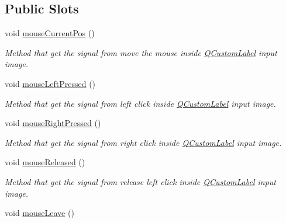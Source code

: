 \subsection*{Public Slots}
\begin{DoxyCompactItemize}
\item 
void \hyperlink{classMainWindow_a8501942bff62e974d8b4565257538c0f}{mouse\+Current\+Pos} ()
\begin{DoxyCompactList}\small\item\em Method that get the signal from move the mouse inside \hyperlink{classQCustomLabel}{Q\+Custom\+Label} input image. \end{DoxyCompactList}\item 
void \hyperlink{classMainWindow_a638cd98f8b593e868829541f2b9f6b63}{mouse\+Left\+Pressed} ()
\begin{DoxyCompactList}\small\item\em Method that get the signal from left click inside \hyperlink{classQCustomLabel}{Q\+Custom\+Label} input image. \end{DoxyCompactList}\item 
void \hyperlink{classMainWindow_ab78b5ef982f3e4d7613a03a9da6fb987}{mouse\+Right\+Pressed} ()
\begin{DoxyCompactList}\small\item\em Method that get the signal from right click inside \hyperlink{classQCustomLabel}{Q\+Custom\+Label} input image. \end{DoxyCompactList}\item 
void \hyperlink{classMainWindow_a089e5ff94a64d40dabe0a6eb36cc08f8}{mouse\+Released} ()\hypertarget{classMainWindow_a089e5ff94a64d40dabe0a6eb36cc08f8}{}\label{classMainWindow_a089e5ff94a64d40dabe0a6eb36cc08f8}

\begin{DoxyCompactList}\small\item\em Method that get the signal from release left click inside \hyperlink{classQCustomLabel}{Q\+Custom\+Label} input image. \end{DoxyCompactList}\item 
void \hyperlink{classMainWindow_a0b3abf28e1dab2b5321f1e53adb8b8c4}{mouse\+Leave} ()\hypertarget{classMainWindow_a0b3abf28e1dab2b5321f1e53adb8b8c4}{}\label{classMainWindow_a0b3abf28e1dab2b5321f1e53adb8b8c4}


\end{DoxyCompactItemize}
